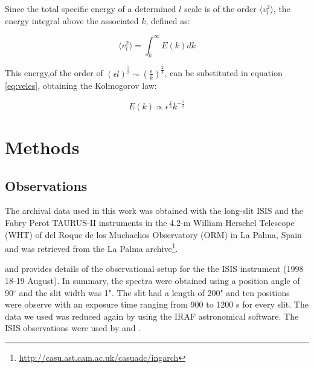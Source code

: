 \documentclass[fleqn,usenatbib]{mnras}
\begin{document}
Since the total specific energy of a determined $l$ scale is of the order $\langle v_{l}^{2} \rangle$, the energy integral above the associated $k$, defined as:

\begin{equation}\label{eq:veles}
 \langle v_{l}^{2} \rangle = \int_{k}^{\infty} E(k)dk
\end{equation}

This energy,of the order of $(\epsilon l)^{\frac{2}{3}} \sim (\frac{\epsilon}{k})^{\frac{2}{3}}$, can be substituted in equation \ref{eq:veles}, obtaining the Kolmogorov law:

\begin{equation}\label{eq:kolm}
E(k) \propto \epsilon^\frac{2}{3} k^{-\frac{5}{3}}
\end{equation}



\section{Methods}\label{sec:met}

\subsection{Observations}\label{sec:obs}

The archival data used in this work was obtained with the long-slit ISIS and the Fabry Perot TAURUS-II instruments in the 4.2-m William Herschel Telescope (WHT) of del Roque de los Muchachos Observatory (ORM) in La Palma, Spain and was retrieved from the La Palma archive\footnote{\url{http://casu.ast.cam.ac.uk/casuadc/ingarch}}.

\citet{2000PASP..112.1138M} and \citep{maiz2004} provides details of the observational setup for the the ISIS instrument (1998 18-19 August). In summary, the spectra were obtained  using a position angle of 90$^{\circ}$ and the slit width was 1". The slit had a length of 200" and ten  positions  were observe with an exposure time ranging from 900 to 1200 s for every slit. The  data we used was reduced again by \citet{jen2013} using the IRAF \citep{1999ascl.soft11002N} astronomical software. The ISIS observations were used by \citet{TT2000} and \citet{maiz2004}.  
\end{document}
